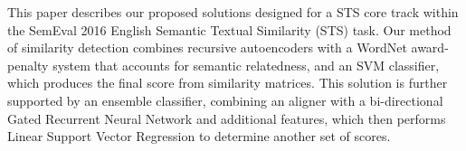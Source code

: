 This paper describes our proposed solutions designed for a STS core track within the SemEval 2016 English Semantic Textual Similarity (STS) task. Our method of similarity detection combines recursive autoencoders with a WordNet award-penalty system that accounts for semantic relatedness, and an SVM classifier, which produces the final score from similarity matrices. This solution is further supported by an ensemble classifier, combining an aligner with a bi-directional Gated Recurrent Neural Network and additional features, which then performs Linear Support Vector Regression to determine another set of scores.
